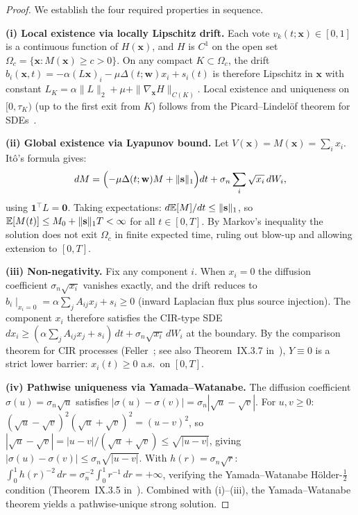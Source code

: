 \documentclass[review,12pt]{elsarticle}
\newcommand{\bfx}{\mathbf{x}}
\newcommand{\bfw}{\mathbf{w}}
\begin{document}
\begin{proof}
We establish the four required properties in sequence.

\textbf{(i) Local existence via locally Lipschitz drift.}
Each vote $v_k(t;\bfx) \in [0,1]$ is a continuous function of $H(\bfx)$, and
$H$ is $C^1$ on the open set $\Omega_c = \{\bfx : M(\bfx) \geq c > 0\}$.
On any compact $K \subset \Omega_c$, the drift
$b_i(\bfx,t) = -\alpha(L\bfx)_i - \mu\Delta(t;\bfw)x_i + s_i(t)$
is therefore Lipschitz in $\bfx$ with constant $L_K = \alpha\|L\|_2 + \mu + \|\nabla_\bfx H\|_{C(K)}$.
Local existence and uniqueness on $[0,\tau_K)$ (up to the first exit from $K$)
follows from the Picard--Lindelöf theorem for SDEs~\cite{oksendal2003stochastic}.

\textbf{(ii) Global existence via Lyapunov bound.}
Let $V(\bfx) = M(\bfx) = \sum_i x_i$.  Itô's formula gives:
\[
  dM = \Bigl(-\mu\Delta(t;\bfw)M + \|{\bf s}\|_1\Bigr)dt
       + \sigma_n\sum_i \sqrt{x_i}\,dW_i,
\]
using $\mathbf{1}^\top L = \mathbf{0}$.  Taking expectations:
$d\mathbb{E}[M]/dt \leq \|{\bf s}\|_1$,
so $\mathbb{E}[M(t)] \leq M_0 + \|{\bf s}\|_1 T < \infty$ for all $t \in [0,T]$.
By Markov's inequality the solution does not exit $\Omega_c$ in finite expected
time, ruling out blow-up and allowing extension to $[0,T]$.

\textbf{(iii) Non-negativity.}
Fix any component $i$.  When $x_i = 0$ the diffusion coefficient
$\sigma_n\sqrt{x_i}$ vanishes exactly, and the drift reduces to
$b_i\!\mid_{x_i=0} = \alpha\sum_j A_{ij}x_j + s_i \geq 0$ (inward
Laplacian flux plus source injection).  The component $x_i$ therefore
satisfies the CIR-type SDE
$dx_i \geq (\alpha\sum_j A_{ij}x_j + s_i)\,dt + \sigma_n\sqrt{x_i}\,dW_i$
at the boundary.  By the comparison theorem for CIR processes
(Feller~\cite{feller1951two}; see also Theorem~IX.3.7 in~\cite{revuzyor1999}),
$Y \equiv 0$ is a strict lower barrier: $x_i(t) \geq 0$ a.s.\ on $[0,T]$.

\textbf{(iv) Pathwise uniqueness via Yamada--Watanabe.}
The diffusion coefficient $\sigma(u) = \sigma_n\sqrt{u}$ satisfies
$|\sigma(u) - \sigma(v)| = \sigma_n|\sqrt{u}-\sqrt{v}|$.
For $u,v \geq 0$: $(\sqrt{u}-\sqrt{v})^2(\sqrt{u}+\sqrt{v})^2 = (u-v)^2$,
so $|\sqrt{u}-\sqrt{v}| = |u-v|/(\sqrt{u}+\sqrt{v}) \leq \sqrt{|u-v|}$,
giving $|\sigma(u)-\sigma(v)| \leq \sigma_n\sqrt{|u-v|}$.
With $h(r)=\sigma_n\sqrt{r}$: $\int_0^1 h(r)^{-2}\,dr = \sigma_n^{-2}\int_0^1 r^{-1}\,dr = +\infty$,
verifying the Yamada--Watanabe Hölder-$\tfrac{1}{2}$ condition
(Theorem~IX.3.5 in~\cite{revuzyor1999}).
Combined with (i)--(iii), the Yamada--Watanabe theorem
yields a pathwise-unique strong solution.
\end{proof}
\end{document}
